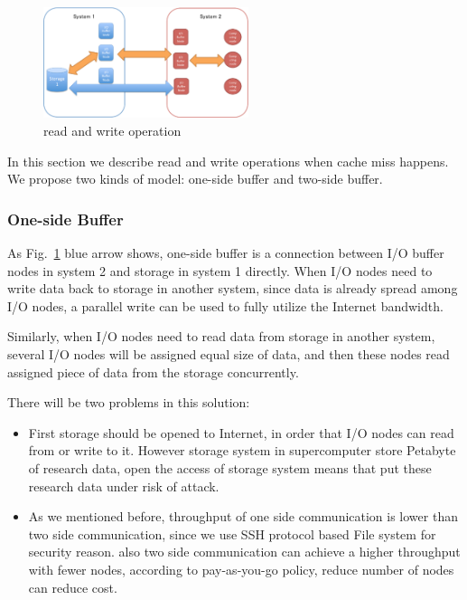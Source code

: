 \begin{figure}[tb]
	\centering
	\includegraphics[width=6cm]{../img/read_and_write}
	\caption{read and write operation}
	\label{read and write}
\end{figure}

In this section we describe read and write operations when cache miss happens.
We propose two kinds of model: one-side buffer and two-side buffer.

\subsubsection{One-side Buffer}

As Fig.~\ref{read and write} blue arrow shows, one-side buffer is a connection between I/O buffer nodes in system 2 and storage in system 1 directly.
When I/O nodes need to write data back to storage in another system, since data is already spread among I/O nodes, a parallel write can be used to fully utilize the Internet bandwidth.

Similarly, when I/O nodes need to read data from storage in another system, several I/O nodes will be assigned equal size of data, and then these nodes read assigned piece of data from the storage concurrently.

There will be two problems in this solution:
\begin{itemize}
	\item First storage should be opened to Internet, in order that I/O nodes can read from or write to it.
		However storage system in supercomputer store Petabyte of research data, open the access of storage system means that put these research data under risk of attack.
	\item As we mentioned before, throughput of one side communication is lower than two side communication, since we use SSH protocol based File system for security reason.
		also two side communication can achieve a higher throughput with fewer nodes, according to pay-as-you-go policy, reduce number of nodes can reduce cost.
\end{itemize}

